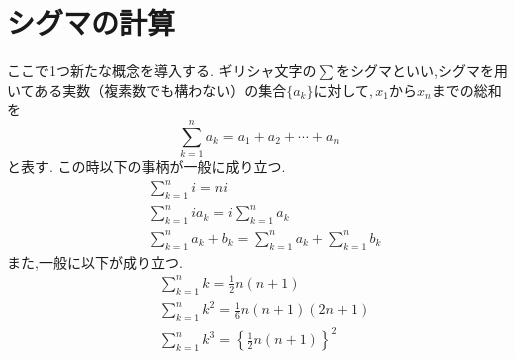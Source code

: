 
\section{シグマの計算}
  ここで1つ新たな概念を導入する.
  ギリシャ文字の$\sum$をシグマといい,シグマを用いてある実数（複素数でも構わない）の集合$\{a_k\}$に対して,\,$x_1$から$x_n$までの総和を
  \[
    \sum_{k=1}^{n} a_k=a_1+a_2+\cdots+ a_n
  \]
  と表す.
  この時以下の事柄が一般に成り立つ.
  \begin{align*}
    &\sum_{k=1}^{n} i=ni\\
    &\sum_{k=1}^{n} ia_k=i\sum_{k=1}^{n} a_k\\
    &\sum_{k=1}^{n} a_k+b_k=\sum_{k=1}^{n} a_k+\sum_{k=1}^{n} b_k
  \end{align*}
  また,一般に以下が成り立つ.
  \begin{align*}
    &\sum_{k=1}^{n} k=\frac{1}{2}n(n+1)\\
    &\sum_{k=1}^{n} k^2=\frac{1}{6}n(n+1)(2n+1)\\
    &\sum_{k=1}^{n} k^3=\left\{\frac{1}{2}n(n+1)\right\}^2\\
  \end{align*}

